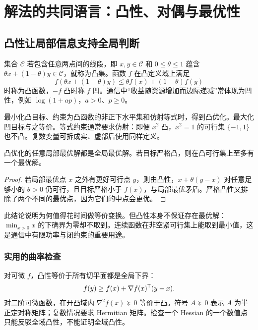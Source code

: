 \chapter{解法的共同语言：凸性、对偶与最优性}\label{ch:foundations}

\section{凸性让局部信息支持全局判断}
集合 $\mathcal C$ 若包含任意两点间的线段，即 $x,y\in\mathcal C$ 和 $0\le\theta\le1$ 蕴含 $\theta x+(1-\theta)y\in\mathcal C$，就称为凸集。函数 $f$ 在凸定义域上满足
\begin{equation}\label{eq:convex-def}
 f(\theta x+(1-\theta)y)\le\theta f(x)+(1-\theta)f(y)
\end{equation}
时称为凸函数，$-f$ 凸时称 $f$ 凹。通信中“收益随资源增加而边际递减”常体现为凹性，例如 $\log(1+ap)$，$a>0$、$p\ge0$。

最小化凸目标、约束为凸函数的非正下水平集和仿射等式时，得到凸优化。最大化凹目标与之等价。等式约束通常要求仿射：即便 $x^2$ 凸，$x^2=1$ 的可行集 $\{-1,1\}$ 也不凸。复数变量可拆成实、虚部后使用同样定义。

\begin{proposition}
凸优化的任意局部最优解都是全局最优解。若目标严格凸，则在凸可行集上至多有一个最优解。
\end{proposition}
\begin{proof}
若局部最优点 $x$ 之外有更好可行点 $y$，则由凸性，$x+\theta(y-x)$ 对任意足够小的 $\theta>0$ 仍可行，且目标严格小于 $f(x)$，与局部最优矛盾。严格凸性又排除了两个不同的最优点，因为它们的中点会更优。
\end{proof}
此结论说明为何值得花时间做等价变换。但凸性本身不保证存在最优解：$\min_{x>0}x$ 的下确界为零却不取到。连续函数在非空紧可行集上能取到最小值，这是通信中有限功率与闭约束的重要用途。

\subsection{实用的曲率检查}
对可微 $f$，凸性等价于所有切平面都是全局下界：
\begin{equation}\label{eq:tangent-lower}
 f(y)\ge f(x)+\nabla f(x)^{\mathsf T}(y-x).
\end{equation}
对二阶可微函数，在开凸域内 $\nabla^2f(x)\succeq0$ 等价于凸。符号 $A\succeq0$ 表示 $A$ 为半正定对称矩阵；复数情况要求 Hermitian 矩阵。检查一个 Hessian 的一个数值点只能反驳全域凸性，不能证明全域凸性。

